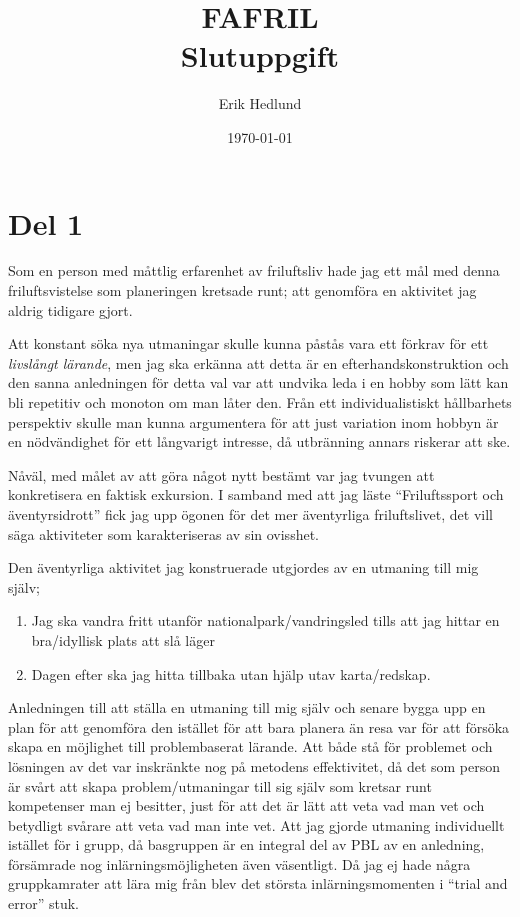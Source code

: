 \documentclass[12pt]{article}   %
\begin{document}
\onehalfspacing %

\title{%
    FAFRIL\\
    \smallskip
    \Large Slutuppgift
}   %
\author{Erik Hedlund}         %
\date{\today}    %
\maketitle

\section*{Del 1}

Som en person med måttlig erfarenhet av friluftsliv hade jag ett mål med denna
friluftsvistelse som planeringen kretsade runt; att genomföra en aktivitet
jag aldrig tidigare gjort.

Att konstant söka nya utmaningar skulle kunna påstås vara ett förkrav för
ett \textit{livslångt lärande}, %
men jag ska erkänna att detta är en efterhandskonstruktion och den sanna anledningen
för detta val var att undvika leda i en hobby som lätt kan bli repetitiv och monoton
om man låter den. Från ett individualistiskt hållbarhets perspektiv skulle man kunna
argumentera för att just variation inom hobbyn är en nödvändighet för ett långvarigt
intresse, då utbränning annars riskerar att ske.

Nåväl, med målet av att göra något nytt bestämt var jag tvungen att konkretisera
en faktisk exkursion. I samband med att jag läste ``Friluftssport och äventyrsidrott''
fick jag upp ögonen för det mer äventyrliga friluftslivet, det vill säga aktiviteter
som karakteriseras av sin ovisshet\cite{sandell2011friluftssport}.

Den äventyrliga aktivitet jag konstruerade utgjordes av en utmaning till mig själv;

\begin{enumerate}
        \item Jag ska vandra fritt utanför nationalpark/vandringsled tills att jag hittar en bra/idyllisk plats att slå läger
        \item Dagen efter ska jag hitta tillbaka utan hjälp utav karta/redskap.
\end{enumerate}

Anledningen till att ställa en utmaning till mig själv och senare bygga upp en plan
för att genomföra den istället för att bara planera än resa var för att försöka
skapa en möjlighet till problembaserat lärande. Att både stå för problemet och
lösningen av det var inskränkte nog på metodens effektivitet, då det som
person är svårt att skapa problem/utmaningar till sig själv som kretsar
runt kompetenser man ej besitter, just för att det är lätt att veta vad man vet
och betydligt svårare att veta vad man inte vet. Att jag gjorde utmaning individuellt
istället för i grupp, då basgruppen är en integral del av PBL\cite{silen2004} av en anledning,
försämrade nog inlärningsmöjligheten även väsentligt. Då jag ej hade några gruppkamrater
att lära mig från blev det största inlärningsmomenten i ``trial and error'' stuk.
\end{document}
